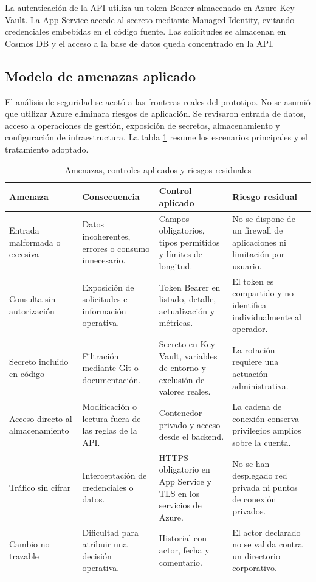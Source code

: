 La autenticación de la API utiliza un token Bearer almacenado en Azure Key Vault. La App Service accede al secreto mediante Managed Identity, evitando credenciales embebidas en el código fuente. Las solicitudes se almacenan en Cosmos DB y el acceso a la base de datos queda concentrado en la API.

\subsection{Modelo de amenazas aplicado}

El análisis de seguridad se acotó a las fronteras reales del prototipo. No se asumió que utilizar Azure eliminara riesgos de aplicación. Se revisaron entrada de datos, acceso a operaciones de gestión, exposición de secretos, almacenamiento y configuración de infraestructura. La tabla \ref{tabla:amenazas-controles} resume los escenarios principales y el tratamiento adoptado.

\begin{table}[ht]
\centering
\scriptsize
\begin{tabularx}{\textwidth}{p{3cm} X X X}
\textbf{Amenaza} & \textbf{Consecuencia} & \textbf{Control aplicado} & \textbf{Riesgo residual} \\
\hline
Entrada malformada o excesiva & Datos incoherentes, errores o consumo innecesario. & Campos obligatorios, tipos permitidos y límites de longitud. & No se dispone de un firewall de aplicaciones ni limitación por usuario. \\
Consulta sin autorización & Exposición de solicitudes e información operativa. & Token Bearer en listado, detalle, actualización y métricas. & El token es compartido y no identifica individualmente al operador. \\
Secreto incluido en código & Filtración mediante Git o documentación. & Secreto en Key Vault, variables de entorno y exclusión de valores reales. & La rotación requiere una actuación administrativa. \\
Acceso directo al almacenamiento & Modificación o lectura fuera de las reglas de la API. & Contenedor privado y acceso desde el backend. & La cadena de conexión conserva privilegios amplios sobre la cuenta. \\
Tráfico sin cifrar & Interceptación de credenciales o datos. & HTTPS obligatorio en App Service y TLS en los servicios de Azure. & No se han desplegado red privada ni puntos de conexión privados. \\
Cambio no trazable & Dificultad para atribuir una decisión operativa. & Historial con actor, fecha y comentario. & El actor declarado no se valida contra un directorio corporativo. \\
\end{tabularx}
\caption{Amenazas, controles aplicados y riesgos residuales}
\label{tabla:amenazas-controles}
\end{table}

